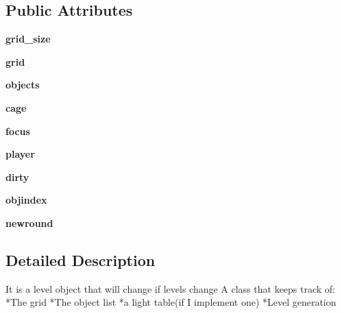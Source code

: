 \subsection*{Public Attributes}
\begin{DoxyCompactItemize}
\item 
\hypertarget{classworld_1_1_world_a80495545c75d4d04a05b6c7f2af7e10b}{}{\bfseries grid\+\_\+size}\label{classworld_1_1_world_a80495545c75d4d04a05b6c7f2af7e10b}

\item 
\hypertarget{classworld_1_1_world_ac2b1e2ca4191d7495a13e989f5eeb339}{}{\bfseries grid}\label{classworld_1_1_world_ac2b1e2ca4191d7495a13e989f5eeb339}

\item 
\hypertarget{classworld_1_1_world_a144e6d2a815857b12be4cd2bf4ac2c44}{}{\bfseries objects}\label{classworld_1_1_world_a144e6d2a815857b12be4cd2bf4ac2c44}

\item 
\hypertarget{classworld_1_1_world_a8bc0f075c35c7d04a7830032b6025a24}{}{\bfseries cage}\label{classworld_1_1_world_a8bc0f075c35c7d04a7830032b6025a24}

\item 
\hypertarget{classworld_1_1_world_a71abf7e2566483f146ab1405ef7c5141}{}{\bfseries focus}\label{classworld_1_1_world_a71abf7e2566483f146ab1405ef7c5141}

\item 
\hypertarget{classworld_1_1_world_a6571e0bde064f220aa3b777ae0321ed8}{}{\bfseries player}\label{classworld_1_1_world_a6571e0bde064f220aa3b777ae0321ed8}

\item 
\hypertarget{classworld_1_1_world_ae1a6854bd142ec9a98e5f40c4cb8ac66}{}{\bfseries dirty}\label{classworld_1_1_world_ae1a6854bd142ec9a98e5f40c4cb8ac66}

\item 
\hypertarget{classworld_1_1_world_a6e9f3cef02533d9cb43b85f7dd101db6}{}{\bfseries objindex}\label{classworld_1_1_world_a6e9f3cef02533d9cb43b85f7dd101db6}

\item 
\hypertarget{classworld_1_1_world_ab16240fa78f1a4cc70d8178ddafe47fd}{}{\bfseries newround}\label{classworld_1_1_world_ab16240fa78f1a4cc70d8178ddafe47fd}

\end{DoxyCompactItemize}


\subsection{Detailed Description}
\begin{DoxyVerb}It is a level object that will change if levels change
A class that keeps track of:
*The grid
*The object list
*a light table(if I implement one)
*Level generation
\end{DoxyVerb}
 

